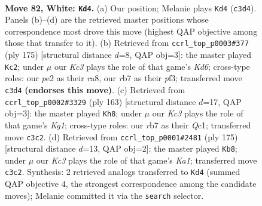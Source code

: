 \documentclass[11pt]{article}
\begin{document}
\clearpage

\begin{figure}[p]\centering
\begin{subfigure}{0.46\textwidth}\centering
\resizebox{\linewidth}{!}{%
\newchessgame
\chessboard[
  setfen={8/1r6/6k1/8/8/2K5/4p1p1/5q2 w - - 0 82},
  showmover=false,
  pgfstyle=straightmove, color=movearrow, markmove={c3-d4}
]}
\caption{}
\end{subfigure}\hfill
\begin{subfigure}{0.46\textwidth}\centering
\resizebox{\linewidth}{!}{%
\newchessgame
\chessboard[
  setfen={R6Q/6P1/8/8/8/3k1P2/6K1/8 b - - 0 88},
  showmover=false,
  pgfstyle=straightmove, color=movearrow, markmove={d3-c2}
]}
\caption{}
\end{subfigure}
\\[4pt]
\begin{subfigure}{0.46\textwidth}\centering
\resizebox{\linewidth}{!}{%
\newchessgame
\chessboard[
  setfen={6k1/8/6Q1/7P/6P1/6K1/8/2q5 b - - 6 82},
  showmover=false,
  pgfstyle=straightmove, color=movearrow, markmove={g8-h8}
]}
\caption{}
\end{subfigure}\hfill
\begin{subfigure}{0.46\textwidth}\centering
\resizebox{\linewidth}{!}{%
\newchessgame
\chessboard[
  setfen={k5K1/3Q4/4P3/8/8/8/8/8 b - - 0 88},
  showmover=false,
  pgfstyle=straightmove, color=movearrow, markmove={a8-b8}
]}
\caption{}
\end{subfigure}
\caption{\textbf{Move 82, White: \texttt{Kd4}.} (a) Our position; Melanie plays \texttt{Kd4} (\texttt{c3d4}). Panels (b)--(d) are the retrieved master positions whose correspondence most drove this move (highest QAP objective among those that transfer to it). (b) Retrieved from \texttt{ccrl\_top\_p0003\#377} (ply 175) [structural distance $d$=8, QAP obj=3]: the master played \texttt{Kc2}; under $\mu$ our \emph{Kc3} plays the role of that game's \emph{Kd6}; cross-type roles: our \emph{p}e2 as their \emph{r}a8, our \emph{r}b7 as their \emph{p}f3; transferred move \texttt{c3d4} \textbf{(endorses this move)}. (c) Retrieved from \texttt{ccrl\_top\_p0002\#3329} (ply 163) [structural distance $d$=17, QAP obj=3]: the master played \texttt{Kh8}; under $\mu$ our \emph{Kc3} plays the role of that game's \emph{Kg1}; cross-type roles: our \emph{r}b7 as their \emph{Q}c1; transferred move \texttt{c3c2}. (d) Retrieved from \texttt{ccrl\_top\_p0001\#2481} (ply 175) [structural distance $d$=13, QAP obj=2]: the master played \texttt{Kb8}; under $\mu$ our \emph{Kc3} plays the role of that game's \emph{Ka1}; transferred move \texttt{c3c2}. Synthesis: 2 retrieved analogs transferred to \texttt{Kd4} (summed QAP objective 4, the strongest correspondence among the candidate moves); Melanie committed it via the \texttt{search} selector.}
\label{fig:thought-m162}
\end{figure}
\end{document}
